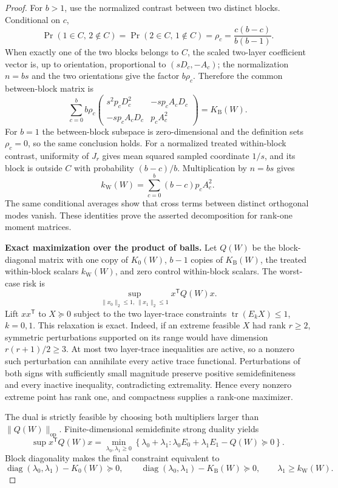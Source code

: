 \documentclass{article}
\begin{document}
\begin{proof}
For \(b>1\), use the normalized contrast between two distinct blocks. Conditional on \(c\),
\[
\Pr(1\in C,\,2\notin C)=\Pr(2\in C,\,1\notin C)
=\rho_c=\frac{c(b-c)}{b(b-1)}.
\]
When exactly one of the two blocks belongs to \(C\), the scaled two-layer coefficient vector is, up to orientation, proportional to \((sD_c,-A_c)\); the normalization \(n=bs\) and the two orientations give the factor \(b\rho_c\). Therefore the common between-block matrix is
\[
\sum_{c=0}^b b\rho_c
\begin{pmatrix}
s^2p_cD_c^2&-sp_cA_cD_c\\
-sp_cA_cD_c&p_cA_c^2
\end{pmatrix}
=K_{\mathrm B}(W).
\]
For \(b=1\) the between-block subspace is zero-dimensional and the definition sets \(\rho_c=0\), so the same conclusion holds. For a normalized treated within-block contrast, uniformity of \(J_r\) gives mean squared sampled coordinate \(1/s\), and its block is outside \(C\) with probability \((b-c)/b\). Multiplication by \(n=bs\) gives
\[
k_{\mathrm W}(W)=\sum_{c=0}^b(b-c)p_cA_c^2.
\]
The same conditional averages show that cross terms between distinct orthogonal modes vanish. These identities prove the asserted decomposition for rank-one moment matrices.

\textbf{Exact maximization over the product of balls.} Let \(Q(W)\) be the block-diagonal matrix with one copy of \(K_0(W)\), \(b-1\) copies of \(K_{\mathrm B}(W)\), the treated within-block scalars \(k_{\mathrm W}(W)\), and zero control within-block scalars. The worst-case risk is
\[
\sup_{\|x_0\|_2\le1,\,\|x_1\|_2\le1}x^{\mathsf T}Q(W)x.
\]
Lift \(xx^{\mathsf T}\) to \(X\succeq0\) subject to the two layer-trace constraints \(\operatorname{tr}(E_kX)\le1\), \(k=0,1\). This relaxation is exact. Indeed, if an extreme feasible \(X\) had rank \(r\ge2\), symmetric perturbations supported on its range would have dimension \(r(r+1)/2\ge3\). At most two layer-trace inequalities are active, so a nonzero such perturbation can annihilate every active trace functional. Perturbations of both signs with sufficiently small magnitude preserve positive semidefiniteness and every inactive inequality, contradicting extremality. Hence every nonzero extreme point has rank one, and compactness supplies a rank-one maximizer.

The dual is strictly feasible by choosing both multipliers larger than \(\|Q(W)\|_{\mathrm{op}}\). Finite-dimensional semidefinite strong duality yields
\[
\sup x^{\mathsf T}Q(W)x
=\min_{\lambda_0,\lambda_1\ge0}
\left\{\lambda_0+\lambda_1:
\lambda_0E_0+\lambda_1E_1-Q(W)\succeq0\right\}.
\]
Block diagonality makes the final constraint equivalent to
\[
\operatorname{diag}(\lambda_0,\lambda_1)-K_0(W)\succeq0,
\qquad
\operatorname{diag}(\lambda_0,\lambda_1)-K_{\mathrm B}(W)\succeq0,
\qquad
\lambda_1\ge k_{\mathrm W}(W).
\]


\end{proof}
\end{document}
